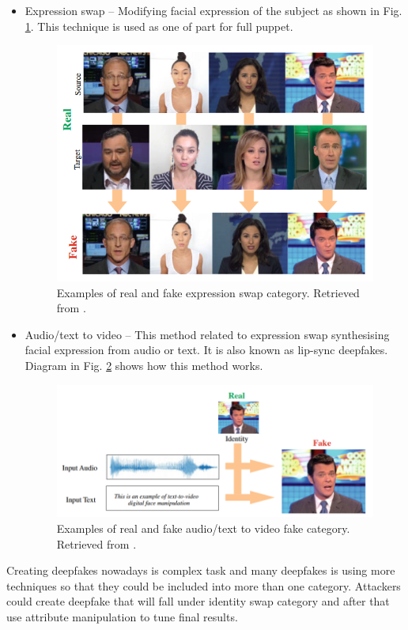 \begin{itemize}
\item Expression swap – Modifying facial expression of the subject as shown in Fig. \ref{fig:expression_swap}. This technique is used as one of part for full puppet.
\begin{figure}[H]
    \centering
    \includegraphics[width=.64\linewidth]{other-fig/expression_swap.png}        
    \caption{Examples of real and fake expression swap category. Retrieved from \cite{IntroductionToDigitalFaceManipulation}.}
\label{fig:expression_swap}
\end{figure}

\item Audio/text to video – This method related to expression swap synthesising facial expression from audio or text. It is also known as lip-sync deepfakes. Diagram in Fig. \ref{fig:audio_to_video} shows how this method works.
\begin{figure}[H]
    \centering
    \includegraphics[width=.65\linewidth]{other-fig/audio_to_video.png}        
    \caption{Examples of real and fake audio/text to video fake category. Retrieved from \cite{IntroductionToDigitalFaceManipulation}.}
\label{fig:audio_to_video}
\end{figure}
\end{itemize}

Creating deepfakes nowadays is complex task and many deepfakes is using more techniques so that they could be included into more than one category. Attackers could create deepfake that will fall under identity swap category and after that use attribute manipulation to tune final results.

